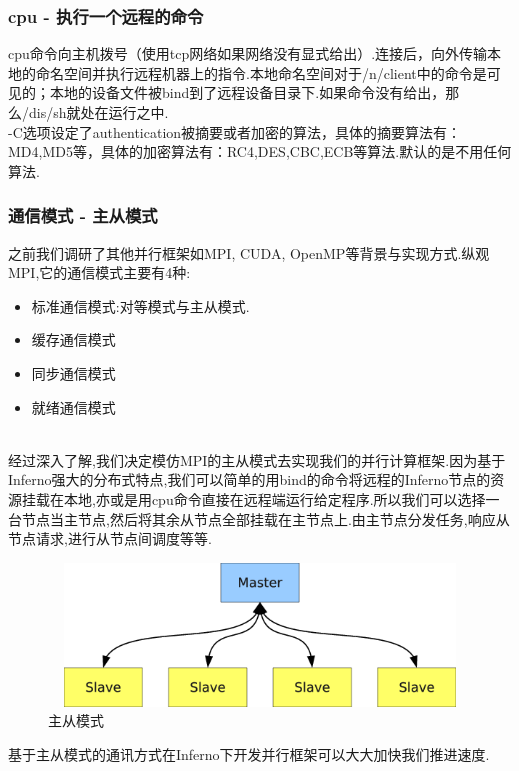 \documentclass[paper=a4]{ctexart} %
\numberwithin{equation}{section} %
\numberwithin{figure}{section} %
\numberwithin{table}{section} %
\newcommand{\n}{\\\indent}
\begin{document}
\subsubsection{cpu - 执行一个远程的命令}
cpu命令向主机拨号（使用tcp网络如果网络没有显式给出）.连接后，向外传输本地的命名空间并执行远程机器上的指令.本地命名空间对于/n/client中的命令是可见的；本地的设备文件被bind到了远程设备目录下.如果命令没有给出，那么/dis/sh就处在运行之中. \n
-C选项设定了authentication被摘要或者加密的算法，具体的摘要算法有：MD4,MD5等，具体的加密算法有：RC4,DES,CBC,ECB等算法.默认的是不用任何算法.

\subsubsection{通信模式 - 主从模式}
之前我们调研了其他并行框架如MPI, CUDA, OpenMP等背景与实现方式.纵观MPI,它的通信模式主要有4种: 
\begin{itemize}
\item 标准通信模式:对等模式与主从模式.
\item 缓存通信模式
\item 同步通信模式
\item 就绪通信模式
\end{itemize}
~\n
经过深入了解,我们决定模仿MPI的主从模式去实现我们的并行计算框架.因为基于Inferno强大的分布式特点,我们可以简单的用bind的命令将远程的Inferno节点的资源挂载在本地,亦或是用cpu命令直接在远程端运行给定程序.所以我们可以选择一台节点当主节点,然后将其余从节点全部挂载在主节点上.由主节点分发任务,响应从节点请求,进行从节点间调度等等.\n
\begin{figure}[htbp]
  \centering
  \includegraphics[width=4.8in,height=1.5in]{pic/master-slave.png}
  \caption{主从模式}
\end{figure}
基于主从模式的通讯方式在Inferno下开发并行框架可以大大加快我们推进速度.
\end{document}
